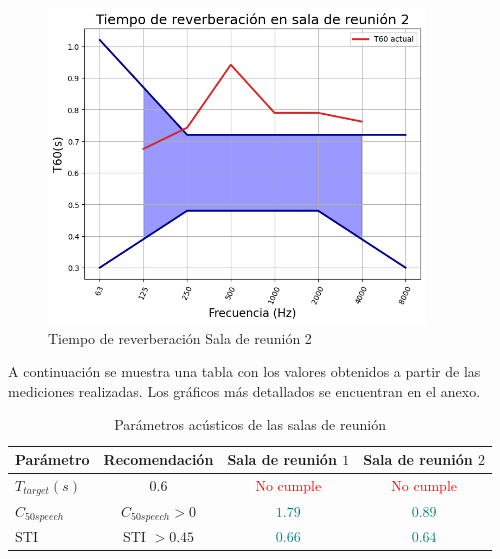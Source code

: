     \begin{figure}[H]
        \centering
        \includegraphics[width=10cm]{Imagenes/DIN/DIN sala reunion 2 actual.png}
        \caption{Tiempo de reverberación Sala de reunión 2}
        \label{fig:Ttarget sala de reunion 2}
    \end{figure}
A continuación se muestra una tabla con los valores obtenidos a partir de las mediciones realizadas. Los gráficos más detallados se encuentran en el anexo.
    \begin{table}[H]
        \centering
        \begin{tabular}{|l|c|c|c|}
        \hline
          \textbf{Parámetro}  & \textbf{Recomendación} & \textbf{Sala de reunión $1$} & \textbf{Sala de reunión $2$}\\ \hline
          $T_{target} (s)$    & $0.6$ & \textcolor{red}{No cumple} & \textcolor{red}{No cumple}\\ \hline
          $C_{50speech}$      & $C_{50speech}>0$ & \textcolor{teal}{$1.79$} & \textcolor{teal}{$0.89$} \\ \hline
          STI & STI $> 0.45$  & \textcolor{teal}{$0.66$} & \textcolor{teal}{$0.64$}\\\hline
        \end{tabular}
        \caption{Parámetros acústicos de las salas de reunión}
        \label{tab: cumplimiento parametros RT salas de reuniones}
    \end{table}
